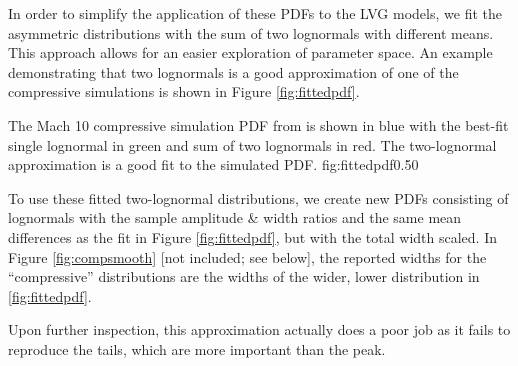 In order to simplify the application of these PDFs to the LVG models, we fit
the asymmetric distributions with the sum of two lognormals with different
means.  This approach allows for an easier exploration of parameter space.
An example demonstrating that two lognormals is a good approximation of one of the
compressive simulations is shown in Figure \ref{fig:fittedpdf}.

{The Mach 10 compressive simulation PDF from \citet{Federrath2012a} is shown in
blue with the best-fit single lognormal in green and sum of two lognormals in
red.  The two-lognormal approximation is a good fit to the simulated PDF.}
{fig:fittedpdf}{0.5}{0}

To use these fitted two-lognormal distributions, we create new PDFs consisting
of lognormals with the sample amplitude \& width ratios and the same mean
differences as the fit in Figure \ref{fig:fittedpdf}, but with the total width
scaled.  In Figure \ref{fig:compsmooth} [not included; see below], the reported widths for the
``compressive'' distributions are the widths of the wider, lower distribution
in \ref{fig:fittedpdf}.

Upon further inspection, this approximation actually does a poor job as it
fails to reproduce the tails, which are more important than the peak.


     

